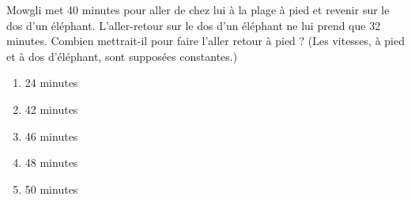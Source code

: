 Mowgli met 40 minutes pour aller de chez lui à la plage à pied et revenir sur le dos d'un éléphant. L'aller-retour sur le dos d'un éléphant ne lui prend que 32 minutes. Combien mettrait-il pour faire l'aller retour à pied ? (Les vitesses, à pied et à dos d'éléphant, sont supposées constantes.)
\begin{multicols}{5}
  \begin{enumerate}[A/]
  \item 24 minutes
  \item 42 minutes
  \item 46 minutes
  \item 48 minutes
  \item 50 minutes
  \end{enumerate}
\end{multicols}